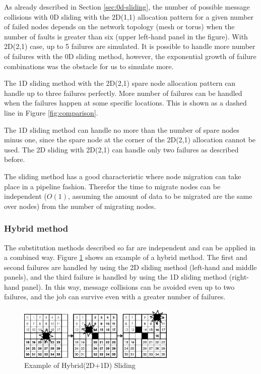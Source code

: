 \documentclass[Afour,times,sagev]{sagej}
\begin{document}
As already described in Section \ref{sec:0d-sliding}, the number of
possible message collisions with 0D sliding with the 2D(1,1)
allocation pattern for a given number of failed nodes depends on the
network topology (mesh or torus) when the number of faults is greater
than six (upper left-hand panel in the figure). With 2D(2,1) case, up
to 5 failures are simulated. It is possible to handle more number of
failures with the 0D sliding method, however, the exponential growth
of failure combinations was the obstacle for us to simulate more.

The 1D sliding method with the 2D(2,1) spare node allocation pattern
can handle up to three failures perfectly. More number of failures can
be handled when the failures happen at some specific locations. This
is shown as a dashed line in Figure \ref{fig:comparison}.

The 1D sliding method can handle no more than the number of
spare nodes minus one, since the spare node at the corner of the
2D(2,1) allocation cannot be used. The 2D sliding with 2D(2,1) can
handle only two failures as described before.

The sliding method has a good characteristic where node migration can
take place in a pipeline fashion. Therefor the time to migrate nodes
can be independent ($O(1)$, assuming the amount of data to be migrated
are the same over nodes) from the number of migrating nodes.

\subsubsection*{Hybrid method}

The substitution methods described so far are independent and can be
applied in a combined way. Figure \ref{fig:hybrid-sliding} shows an
example of a hybrid method. The first and second failures are handled
by using the 2D sliding method (left-hand and middle panels), and the
third failure is handled by using the 1D sliding method (right-hand
panel). In this way, message collisions can be avoided even up to two
failures, and the job can survive even with a greater number of
failures.

\begin{figure}[ht]
\centering
\includegraphics[width=75mm]{Figs/Hybrid.eps}
  \caption{Example of Hybrid(2D+1D) Sliding}
  \label{fig:hybrid-sliding}
\end{figure}
\end{document}
